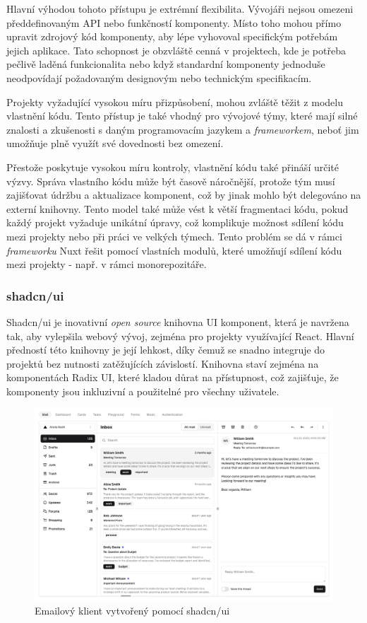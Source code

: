 Hlavní výhodou tohoto přístupu je extrémní flexibilita. Vývojáři nejsou omezeni předdefinovaným API nebo funkčností komponenty. Místo toho mohou přímo upravit zdrojový kód komponenty, aby lépe vyhovoval specifickým potřebám jejich aplikace. Tato schopnost je obzvláště cenná v projektech, kde je potřeba pečlivě laděná funkcionalita nebo když standardní komponenty jednoduše neodpovídají požadovaným designovým nebo technickým specifikacím.

Projekty vyžadující vysokou míru přizpůsobení, mohou zvláště těžit z modelu vlastnění kódu. Tento přístup je také vhodný pro vývojové týmy, které mají silné znalosti a zkušenosti s daným programovacím jazykem a \emph{frameworkem}, neboť jim umožňuje plně využít své dovednosti bez omezení.

Přestože poskytuje vysokou míru kontroly, vlastnění kódu také přináší určité výzvy. Správa vlastního kódu může být časově náročnější, protože tým musí zajišťovat údržbu a aktualizace komponent, což by jinak mohlo být delegováno na externí knihovny. Tento model také může vést k větší fragmentaci kódu, pokud každý projekt vyžaduje unikátní úpravy, což komplikuje možnost sdílení kódu mezi projekty nebo při práci ve velkých týmech. Tento problém se dá v rámci \emph{frameworku} Nuxt řešit pomocí vlastních modulů, které umožňují sdílení kódu mezi projekty - např. v rámci monorepozitáře.

\subsubsection{shadcn/ui}
Shadcn/ui je inovativní \emph{open source} knihovna UI komponent, která je navržena tak, aby vylepšila webový vývoj, zejména pro projekty využívající React.
Hlavní předností této knihovny je její lehkost, díky čemuž se snadno integruje do projektů bez nutnosti zatěžujících závislostí. Knihovna staví
zejména na komponentách Radix UI, které kladou důrat na přístupnost, což zajišťuje, že komponenty jsou inkluzivní a použitelné pro všechny uživatele. \cite{ShadcnUI}

\begin{figure}[H]
    \includegraphics[width=\textwidth]{images/shadcn}
    \caption{Emailový klient vytvořený pomocí shadcn/ui} \label{picture:shadcn}
\end{figure}

